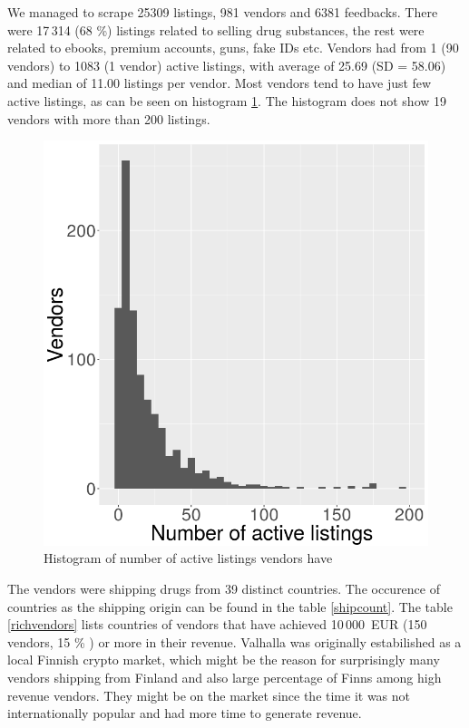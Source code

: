 \documentclass[
  digital, %
  table,   %
  lof,     %
  lot,     %
  oneside
]{fithesis3}
\begin{document}
We managed to scrape 25309 listings, 981 vendors and 6381 feedbacks.
There were 17\,314 (68 \%) listings related to selling drug substances, the rest
were related to ebooks, premium accounts, guns, fake IDs etc.
Vendors had from 1 (90 vendors) to 1083 (1 vendor)
active listings, with average of 25.69 (SD = 58.06)
and median of 11.00 listings per vendor.
Most vendors tend to have just few active listings,
as can be seen on histogram \ref{listingsxsellers}.
The histogram does not show 19 vendors with more than 200 listings.

\begin{figure}[!htb]
    \centering
    \includegraphics[scale=0.6]{listingsxsellers}
    \centering
    \caption{Histogram of number of active listings vendors have}
    \label{listingsxsellers}
\end{figure}

The vendors were shipping drugs from 39 distinct countries.
The occurence of countries as the shipping origin can be found in the table \ref{shipcount}.
The table \ref{richvendors} lists countries of vendors that have achieved 10\,000~EUR (150 vendors, 15 \% ) or more in their revenue.
Valhalla was originally estabilished as a local Finnish crypto market,
which might be the reason for surprisingly many vendors shipping from Finland and also large percentage
of Finns among high revenue vendors. They might be on the market since
the time it was not internationally popular and had more time to generate revenue.
\end{document}

